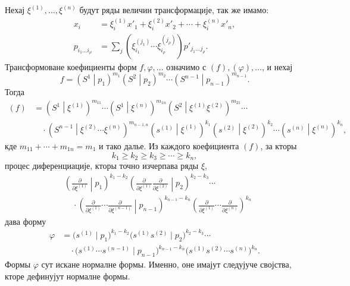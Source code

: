 \documentclass[11pt]{article}
\newcommand{\pair}[2]{\left(#1\middle|#2\right)}
\begin{document}
Нехај $\xi^{(1)},\ldots,\xi^{(n)}$ будут ряды величин трансформације, так же имамо:
\begin{equation}
\begin{aligned}
x_i&=\xi_i^{(1)}x'_1+\xi_i^{(2)}x'_2+\cdots+\xi_i^{(n)}x'_n,\\
p_{i_1\ldots i_\rho}&=\sum_j(\xi_{i_1}^{(j_1)}\cdots \xi_{i_\rho}^{(j_\rho)})p'_{j_1\ldots j_\rho}.
\end{aligned}
\tag{47}
\end{equation}
Трансформоване коефициенты форм $f,\varphi,\ldots$ означимо с $(f),(\varphi),\ldots$, и нехај
\[
 f=\pair{S^1}{p_1}^{m_1}\pair{S^2}{p_2}^{m_2}\cdots\pair{S^{n-1}}{p_{n-1}}^{m_{n-1}}.
\]
Тогда
\begin{equation}
\begin{aligned}
(f)&=\pair{S^1}{\xi^{(1)}}^{m_{11}}\cdots
\pair{S^1}{\xi^{(n)}}^{m_{1n}}
\pair{S^2}{\xi^{(1)}\xi^{(2)}}^{m_{21}}\cdots\\
&\quad\cdot
\pair{S^{n-1}}{\xi^{(2)}\cdots\xi^{(n)}}^{m_{n-1,n}}
\pair{s^{(1)}}{\xi^{(1)}}^{k_1}
\pair{s^{(2)}}{\xi^{(2)}}^{k_2}\cdots
\pair{s^{(n)}}{\xi^{(n)}}^{k_n},
\end{aligned}
\tag{48}
\end{equation}
кде $m_{11}+\cdots+m_{1n}=m_1$ и тако далье. Из каждого коефициента $(f)$, за кторы
\begin{equation}
 k_1\ge k_2\ge k_3\ge\cdots\ge k_n,
\tag{49}
\end{equation}
процес диференциације, кторы точно изчерпава ряды $\xi$,
\begin{equation}
\begin{aligned}
&\left(\frac{\partial}{\partial\xi^{(1)}}\middle|p_1\right)^{k_1-k_2}
\left(\frac{\partial}{\partial\xi^{(1)}}\frac{\partial}{\partial\xi^{(2)}}\middle|p_2\right)^{k_2-k_3}\cdots\\
&\quad\cdot
\left(\frac{\partial}{\partial\xi^{(1)}}\cdots\frac{\partial}{\partial\xi^{(n-1)}}\middle|p_{n-1}\right)^{k_{n-1}-k_n}
\left(\frac{\partial}{\partial\xi^{(1)}}\cdots\frac{\partial}{\partial\xi^{(n)}}\right)^{k_n}
\end{aligned}
\tag{50}
\end{equation}
дава форму
\begin{equation}
\begin{aligned}
 \varphi&=\bigl(s^{(1)}\mid p_1\bigr)^{k_1-k_2}
 \bigl(s^{(1)}s^{(2)}\mid p_2\bigr)^{k_2-k_3}\cdots\\
 &\quad\cdot
 \bigl(s^{(1)}\cdots s^{(n-1)}\mid p_{n-1}\bigr)^{k_{n-1}-k_n}
 \bigl(s^{(1)}s^{(2)}\cdots s^{(n)}\bigr)^{k_n}.
\end{aligned}
\tag{51}
\end{equation}
Формы $\varphi$ сут искане нормалне формы. Именно, оне имајут следујуче својства, кторе дефинујут нормалне формы.
\end{document}
